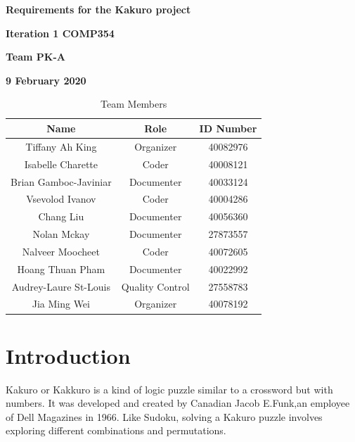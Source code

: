 \documentclass[12pt]{article}
\begin{document}
\vspace*{0.5in}
\centerline{\bf\Large
Requirements for the Kakuro project}

\vspace*{0.5in}
\centerline{\bf\Large Iteration 1 COMP354}

\vspace*{0.5in}
\centerline{\bf\Large Team PK-A}

\vspace*{0.5in}
\centerline{\bf\Large 9 February 2020}

\vspace*{1.5in}
\begin{table}[htbp]
\caption{Team Members}
\begin{center}
\begin{tabular}{|c |c | c|}
\hline
Name & Role & ID Number \\
\hline\hline
Tiffany Ah King & Organizer & 40082976 \\
\hline
Isabelle Charette & Coder & 40008121 \\
\hline
Brian Gamboc-Javiniar & Documenter & 40033124 \\
\hline
Vsevolod Ivanov & Coder & 40004286 \\
\hline
Chang Liu & Documenter & 40056360 \\
\hline
Nolan Mckay & Documenter & 27873557 \\
\hline
Nalveer Moocheet & Coder & 40072605 \\
\hline
Hoang Thuan Pham & Documenter & 40022992 \\
\hline
Audrey-Laure St-Louis & Quality Control & 27558783 \\
\hline
Jia Ming Wei & Organizer & 40078192 \\
\hline
\end{tabular}
\end{center}
\end{table}


\newpage



 \renewcommand*\contentsname{Table of Contents}

 

\tableofcontents


\newpage
\section{Introduction}


Kakuro or Kakkuro  is a kind of logic puzzle similar to a crossword but with numbers. It was developed and created by Canadian Jacob E.Funk,an employee of Dell Magazines in 1966. Like Sudoku, solving a Kakuro puzzle involves exploring different combinations and permutations.\\
\end{document}
